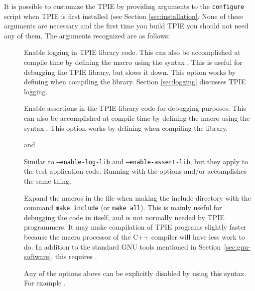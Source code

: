 It is possible to customize the TPIE by providing
arguments to the {\tt configure}
script when TPIE is first installed (see Section \ref{sec:installation}. None of these
 arguments are necessary and the first time you build TPIE
 you should not need any of them. The arguments
recognized are as follows:
\begin{description}
\item[] 
  Enable logging in TPIE library code.
  This can also be accomplished at compile time by defining the macro
   using the syntax .
  This is useful for debugging the TPIE library, but slows it down.
  This option works by defining 
  when compiling the library. 
  Section \ref{sec:logging} discusses TPIE logging.
\item[]  
  Enable assertions in the TPIE library code for debugging purposes.
  This can also be accomplished at compile time by defining the macro
   using the syntax .
  This option works by defining 
  when compiling the library.
\item[]  and
\item[]  
  Similar to {\tt --enable-log-lib} and {\tt --enable-assert-lib}, but
  they apply to the test application code.  Running 
  with the options  and/or 
  accomplishes the same thing.
\item[]  Expand the macros in the file
   when making the include directory with the
command {\tt make include} (or {\tt make all}).  This is mainly useful for
debugging the code in  itself, and is not normally
needed by TPIE programmers.  It may make compilation of TPIE programs
slightly faster because the macro processor of the C++ compiler will
have less work to do.  In addition to the standard GNU tools mentioned
in Section~\ref{sec:gnu-software}, this requires .
\item[]  Any of the options above can be explicitly
  disabled  by using this syntax.  For example
  . 
\end{description}

